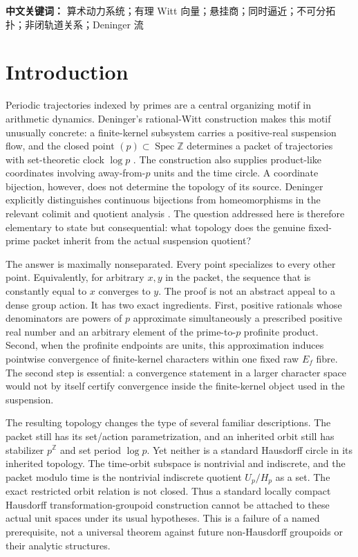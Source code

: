 \documentclass[11pt]{article}
\theoremstyle{definition}
\newcommand{\Z}{\mathbb{Z}}
\begin{document}
\medskip
\noindent\textbf{中文关键词：} 算术动力系统；有理 Witt 向量；悬挂商；同时逼近；不可分拓扑；非闭轨道关系；Deninger 流

\tableofcontents

\section{Introduction}

Periodic trajectories indexed by primes are a central organizing motif in arithmetic dynamics.  Deninger's rational-Witt construction makes this motif unusually concrete: a finite-kernel subsystem carries a positive-real suspension flow, and the closed point \((p)\subset\operatorname{Spec}\Z\) determines a packet of trajectories with set-theoretic clock \(\log p\) \cite[Section~6 and Theorem~6.1, physical pp.~38--39]{Deninger2026}.  The construction also supplies product-like coordinates involving away-from-\(p\) units and the time circle.  A coordinate bijection, however, does not determine the topology of its source.  Deninger explicitly distinguishes continuous bijections from homeomorphisms in the relevant colimit and quotient analysis \cite[Propositions~7.4 and 7.6--7.9, Theorem~7.10 and Remark~2, physical pp.~43--47]{Deninger2026}.  The question addressed here is therefore elementary to state but consequential: what topology does the genuine fixed-prime packet inherit from the actual suspension quotient?

The answer is maximally nonseparated.  Every point specializes to every other point.  Equivalently, for arbitrary \(x,y\) in the packet, the sequence that is constantly equal to \(x\) converges to \(y\).  The proof is not an abstract appeal to a dense group action.  It has two exact ingredients.  First, positive rationals whose denominators are powers of \(p\) approximate simultaneously a prescribed positive real number and an arbitrary element of the prime-to-\(p\) profinite product.  Second, when the profinite endpoints are units, this approximation induces pointwise convergence of finite-kernel characters within one fixed raw \(E_f\) fibre.  The second step is essential: a convergence statement in a larger character space would not by itself certify convergence inside the finite-kernel object used in the suspension.

The resulting topology changes the type of several familiar descriptions.  The packet still has its set/action parametrization, and an inherited orbit still has stabilizer \(p^{\Z}\) and set period \(\log p\).  Yet neither is a standard Hausdorff circle in its inherited topology.  The time-orbit subspace is nontrivial and indiscrete, and the packet modulo time is the nontrivial indiscrete quotient \(U_p/H_p\) as a set.  The exact restricted orbit relation is not closed.  Thus a standard locally compact Hausdorff transformation-groupoid construction cannot be attached to these actual unit spaces under its usual hypotheses.  This is a failure of a named prerequisite, not a universal theorem against future non-Hausdorff groupoids or their analytic structures.
\end{document}
